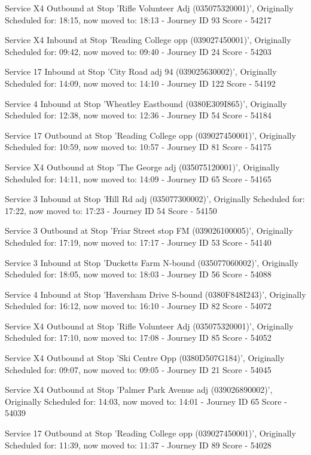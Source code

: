 \documentclass{article}
\begin{document}
Service X4 Outbound at Stop 'Rifle Volunteer Adj (035075320001)', Originally Scheduled for: 18:15, now moved to: 18:13 - Journey ID 93      Score - 54217

Service X4 Inbound at Stop 'Reading College opp (039027450001)', Originally Scheduled for: 09:42, now moved to: 09:40 - Journey ID 24      Score - 54203

Service 17 Inbound at Stop 'City Road adj 94 (039025630002)', Originally Scheduled for: 14:09, now moved to: 14:10 - Journey ID 122      Score - 54192

Service 4 Inbound at Stop 'Wheatley Eastbound (0380E309I865)', Originally Scheduled for: 12:38, now moved to: 12:36 - Journey ID 54      Score - 54184

Service 17 Outbound at Stop 'Reading College opp (039027450001)', Originally Scheduled for: 10:59, now moved to: 10:57 - Journey ID 81      Score - 54175

Service X4 Outbound at Stop 'The George adj (035075120001)', Originally Scheduled for: 14:11, now moved to: 14:09 - Journey ID 65      Score - 54165

Service 3 Inbound at Stop 'Hill Rd adj (035077300002)', Originally Scheduled for: 17:22, now moved to: 17:23 - Journey ID 54      Score - 54150

Service 3 Outbound at Stop 'Friar Street stop FM (039026100005)', Originally Scheduled for: 17:19, now moved to: 17:17 - Journey ID 53      Score - 54140

Service 3 Inbound at Stop 'Ducketts Farm N-bound (035077060002)', Originally Scheduled for: 18:05, now moved to: 18:03 - Journey ID 56      Score - 54088

Service 4 Inbound at Stop 'Haversham Drive S-bound (0380F848I243)', Originally Scheduled for: 16:12, now moved to: 16:10 - Journey ID 82      Score - 54072

Service X4 Outbound at Stop 'Rifle Volunteer Adj (035075320001)', Originally Scheduled for: 17:10, now moved to: 17:08 - Journey ID 85      Score - 54052

Service X4 Outbound at Stop 'Ski Centre Opp (0380D507G184)', Originally Scheduled for: 09:07, now moved to: 09:05 - Journey ID 21      Score - 54045

Service X4 Outbound at Stop 'Palmer Park Avenue adj (039026890002)', Originally Scheduled for: 14:03, now moved to: 14:01 - Journey ID 65      Score - 54039

Service 17 Outbound at Stop 'Reading College opp (039027450001)', Originally Scheduled for: 11:39, now moved to: 11:37 - Journey ID 89      Score - 54028
\end{document}
